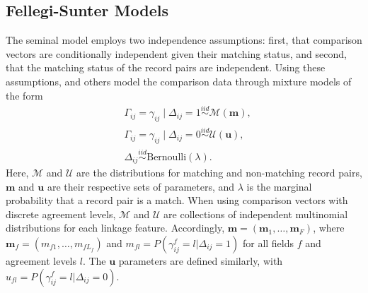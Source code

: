 \documentclass[ba]{imsart}
\begin{document}

%

\subsection{Fellegi-Sunter Models}
\label{fellegi-sunter}

The seminal \cite{fellegi_theory_1969} model employs two independence assumptions: first, that comparison vectors are conditionally independent given their matching status, and second, that the matching status of the record pairs are independent. Using these assumptions, \cite{winkler_state_1999, jaro1989, larsen_2001, enamorado2019using} and others model the comparison data through mixture models of the form
\begin{subequations}
\begin{align}
	&\Gamma_{ij} = \gamma_{ij} \mid \Delta_{ij} = 1 \stackrel{iid}{\sim} \mathcal{M}(\bm{m}), \label{eqn:fs_model} \\
	&\Gamma_{ij} = \gamma_{ij} \mid \Delta_{ij} = 0  \stackrel{iid}{\sim} \mathcal{U}(\bm{u}), \label{eqn:m_dist}\\
	& \Delta_{ij}   \stackrel{iid}{\sim} \text{Bernoulli}(\lambda). \label{eqn:u_dist}
\end{align}
\end{subequations}
Here, $\mathcal{M}$ and $\mathcal{U}$ are the distributions for matching and non-matching record pairs, $\bm{m}$ and $\bm{u}$ are their respective sets of parameters, and $\lambda$ is the marginal probability that a record pair is a match. When using comparison vectors with discrete agreement levels, $\mathcal{M}$ and $\mathcal{U}$ are collections of independent multinomial distributions for each linkage feature. Accordingly, $\bm{m} = (\bm{m}_1, \ldots, \bm{m}_F)$, where $\bm{m}_f = (m_{f1}, \ldots, m_{fL_f})$ and $m_{fl} = P(\gamma_{ij}^f = l|\Delta_{ij} = 1)$ for all fields $f$ and agreement levels $l$. The $\bm{u}$ parameters are defined similarly, with $u_{fl} = P(\gamma_{ij}^f = l|\Delta_{ij} = 0)$.
\end{document}
